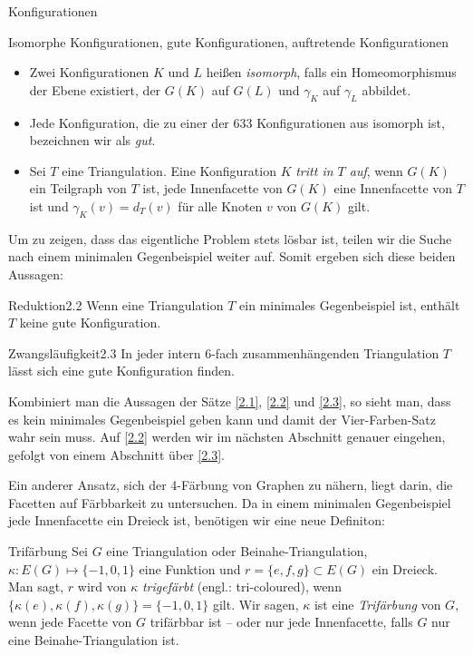 \begin{section}{Konfigurationen}
 \begin{definition}{Isomorphe Konfigurationen, gute Konfigurationen, auftretende Konfigurationen}
 \-\ 
  \begin{itemize}
   \item Zwei Konfigurationen $K$ und $L$ heißen \textit{isomorph}, falls ein Homeomorphismus der Ebene existiert, der $G(K)$ auf $G(L)$ und $\gamma_K$ auf $\gamma_L$ abbildet. 
   \item Jede Konfiguration, die zu einer der 633 Konfigurationen aus \cite{FourRSST} isomorph ist, bezeichnen wir als \textit{gut}. 
   \item Sei $T$ eine Triangulation. Eine Konfiguration $K$ \textit{tritt in $T$ auf}, wenn $G(K)$ ein Teilgraph von $T$ ist, jede Innenfacette von $G(K)$ eine Innenfacette von $T$ ist und $\gamma_K(v) = d_T(v)$ für alle Knoten $v$ von $G(K)$ gilt.
  \end{itemize}

 \end{definition}

 Um zu zeigen, dass das eigentliche Problem stets lösbar ist, teilen wir die Suche nach einem minimalen Gegenbeispiel weiter auf. Somit ergeben sich diese beiden Aussagen:
   
 \begin{satzl}{Reduktion}{2.2}
  Wenn eine Triangulation $T$ ein minimales Gegenbeispiel ist, enthält $T$ keine gute Konfiguration.
 \end{satzl}
   
 \begin{satzl}{Zwangsläufigkeit}{2.3}
  In jeder intern 6-fach zusammenhängenden Triangulation $T$ lässt sich eine gute Konfiguration finden.
 \end{satzl}
   
 Kombiniert man die Aussagen der Sätze \ref{2.1}, \ref{2.2} und \ref{2.3}, so sieht man, dass es kein minimales Gegenbeispiel geben kann und damit der Vier-Farben-Satz wahr sein muss. Auf \ref{2.2} werden wir im nächsten Abschnitt genauer eingehen, gefolgt von einem Abschnitt über \ref{2.3}. 
 
 Ein anderer Ansatz, sich der 4-Färbung von Graphen zu nähern, liegt darin, die Facetten auf Färbbarkeit zu untersuchen. Da in einem minimalen Gegenbeispiel jede Innenfacette ein Dreieck ist, benötigen wir eine neue Definiton:
 
 \begin{definition}{Trifärbung}
  Sei $G$ eine Triangulation oder Beinahe-Triangulation, $\kappa:E(G) \mapsto \{-1,0,1\}$ eine Funktion und $r=\{e,f,g\} \subset E(G)$ ein Dreieck. Man sagt, $r$ wird von $\kappa$ \textit{trigefärbt} (engl.: tri-coloured), wenn $\{\kappa(e),\kappa(f),\kappa(g)\} = \{-1,0,1\}$ gilt. Wir sagen, $\kappa$ ist eine \textit{Trifärbung} von $G$, wenn jede Facette von $G$ trifärbbar ist -- oder nur jede Innenfacette, falls $G$ nur eine Beinahe-Triangulation ist.
 \end{definition}


\end{section}
